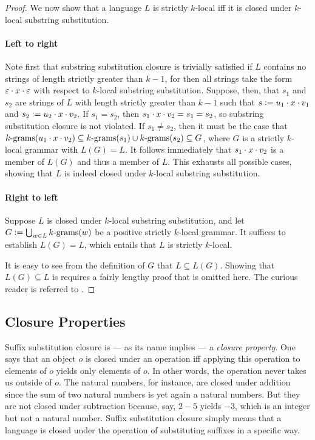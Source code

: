 \begin{proof}
    We now show that a language $L$ is strictly $k$-local iff it is closed under $k$-local substring substitution.
    
    \paragraph{Left to right}
    Note first that substring substitution closure is trivially satisfied if $L$ contains no strings of length strictly greater than $k-1$, for then all strings take the form $\emptystring \stringcat x \stringcat \emptystring$ with respect to $k$-local substring substitution.
    Suppose, then, that $s_1$ and $s_2$ are strings of $L$ with length strictly greater than $k-1$ such that $s \is u_1 \stringcat x \stringcat v_1$ and $s_2 \is u_2 \stringcat x \stringcat v_2$.
    If $s_1 = s_2$, then $s_1 \stringcat x \stringcat v_2 = s_1 = s_2$, so substring substitution closure is not violated.
    If $s_1 \neq s_2$, then it must be the case that $\Bigrams[k](u_1 \stringcat x \stringcat v_2) \subseteq \Bigrams[k](s_1) \cup \Bigrams[k](s_2) \subseteq G$, where $G$ is a strictly $k$-local grammar with $L(G) = L$.
    It follows immediately that $s_1 \stringcat x \stringcat v_2$ is a member of $L(G)$ and thus a member of $L$. 
    This exhausts all possible cases, showing that $L$ is indeed closed under $k$-local substring substitution.

    \paragraph{Right to left}
    Suppose $L$ is closed under $k$-local substring substitution, and let $G \is \bigcup_{w \in L} \Bigrams[k](w)$ be a positive strictly $k$-local grammar.
    It suffices to establish $L(G) = L$, which entails that $L$ is strictly $k$-local.

    It is easy to see from the definition of $G$ that $L \subseteq L(G)$.
    Showing that $L(G) \subseteq L$ is requires a fairly lengthy proof that is omitted here.
    The curious reader is referred to \citet[19--21]{Rogers07}.
\end{proof}

\subsection{Closure Properties}

Suffix substitution closure is --- as its name implies --- a \emph{closure property}.
One says that an object $o$ is closed under an operation iff applying this operation to elements of $o$ yields only elements of $o$.
In other words, the operation never takes us outside of $o$.
The natural numbers, for instance, are closed under addition since the sum of two natural numbers is yet again a natural numbers.
But they are not closed under subtraction because, say, $2-5$ yields $-3$, which is an integer but not a natural number.
Suffix substitution closure simply means that a language is closed under the operation of substituting suffixes in a specific way.

